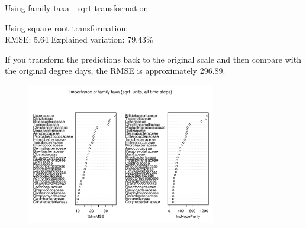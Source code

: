 \documentclass{beamer}
\begin{document}
\begin{frame}{Using family taxa - sqrt transformation}

  {\scriptsize
    
  \noindent Using square root transformation:\\
  RMSE: 5.64  \hspace{0.05in}  Explained variation: 79.43\%

  \vspace{0.05in}
  
  \noindent If you transform the predictions back to the original
  scale and then compare with the original degree days, the RMSE is
  approximately 296.89.
  
\begin{center}
\begin{figure}
  \includegraphics[width=3.25in]{../only_families/all_time_steps/sqrt_units_all_data_families_imp_plot}
\end{figure}
\end{center}
\vspace{-0.25in}
}
  
\end{frame}
\end{document}
